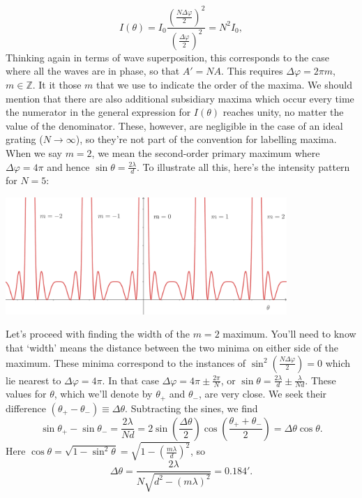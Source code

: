 \documentclass[../TST.tex]{subfiles}
\begin{document}
\begin{solution}
\begin{equation*}
I(\theta)=I_0 \frac{\left(\frac{N\Delta\varphi}{2}\right)^2 }{\left(\frac{\Delta\varphi}{2}\right)^2 }=N^2I_0
,
\end{equation*}
Thinking again in terms of wave superposition, this corresponds to the case  where all the waves are in phase, so that $A'=NA$. This requires $\Delta\varphi = 2\pi m$, $m\in\mathbb{Z}$. It it those $m$ that we use to indicate the order of the maxima. We should mention that there are also additional subsidiary maxima which occur every time the numerator in the general expression for $I(\theta)$ reaches unity, no matter the value of the denominator. These, however, are negligible in the case of an ideal grating ($N\rightarrow \infty$), so they're not part of the convention for labelling maxima. When we say $m=2$, we mean the second-order primary maximum where $\Delta\varphi = 4\pi$ and hence $\sin{\theta}=\frac{2\lambda}{d}$. To illustrate all this, here's the intensity pattern for $N=5$:
\begin{center}
\includegraphics[width=0.8\textwidth]{fig/a2007_s6.pdf}
\end{center}
Let's proceed with finding the width of the $m=2$ maximum. You'll need to know that `width' means the distance between the two minima on either side of the maximum. These minima correspond to the instances of $\sin^2\left(\frac{N\Delta\varphi}{2}\right)=0$ which lie nearest to $\Delta\varphi=4\pi$. In that case $\Delta\varphi=4\pi\pm \frac{2\pi}{N}$, or $\sin\theta= \frac{2\lambda}{d}\pm \frac{\lambda}{Nd}$. These values for $\theta$, which we'll denote by $\theta_+$ and $\theta_-$, are very close. We seek their difference $(\theta_+-\theta_-)\equiv\Delta\theta$. Subtracting the sines, we find 
\begin{equation*}
	\sin{\theta_+}-\sin{\theta_-}=\frac{2\lambda}{Nd}=2\sin{\left( \frac{\Delta\theta}{2}\right)}\cos{\left( \frac{\theta_++\theta_-}{2}\right)}=\Delta\theta\cos{\theta}
.
\end{equation*}
Here $\cos{\theta}=\sqrt{1-\sin^2{\theta}}=\sqrt{1-\left(\frac{m\lambda}{d}\right)^2 }$, so
\begin{equation*}
\boxed{\Delta\theta = \frac{2\lambda}{N\sqrt{d^2-(m\lambda)^2}}=\ang{;0.184}.}
\end{equation*}

\end{solution}
\fi
\end{document}

